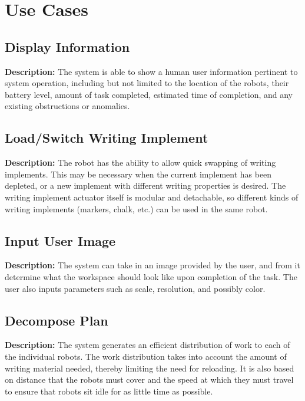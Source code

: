 
\section{Use Cases}
\label{sec:use_cases}


\subsection{Display Information}
\textbf{Description:} The system is able to show a human user information pertinent to system operation, including but not limited to the location of the robots, their battery level, amount of task completed, estimated time of completion, and any existing obstructions or anomalies.

\subsection{Load/Switch Writing Implement}
\textbf{Description:} The robot has the ability to allow quick swapping of writing implements. This may be necessary when the current implement has been depleted, or a new  implement with different writing properties is desired. The writing implement actuator itself is modular and detachable, so different kinds of writing implements (markers, chalk, etc.) can be used in the same robot.

\subsection{Input User Image}
\textbf{Description:} The system can take in an image provided by the user, and from it determine what the workspace should look like upon completion of the task. The user also inputs parameters such as scale, resolution, and possibly color. 

\subsection{Decompose Plan}
\textbf{Description:} The system generates an efficient distribution of work to each of the individual robots. The work distribution takes into account the amount of writing material needed, thereby limiting the need for reloading. It is also based on distance that the robots must cover and the speed at which they must travel to ensure that robots sit idle for as little time as possible.

